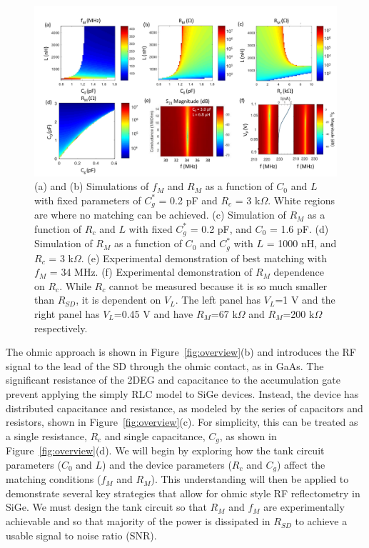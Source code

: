 \documentclass{article}
\begin{document}
	\begin{figure}
		\includegraphics[width = \textwidth]{figures/HarvardFigure2_v7.pdf}		
		\caption{(a) and (b) Simulations of $f_M$ and $R_M$ as a function of $C_0$ and $L$ with fixed parameters of $C^*_g$ = 0.2 pF and $R_c$ = 3 k$\Omega$. White regions are where no matching can be achieved.  (c) Simulation of $R_M$ as a function of $R_c$ and $L$ with fixed $C^*_g$ = 0.2 pF, and $C_0$ = 1.6 pF. (d) Simulation of $R_M$ as a function of $C_0$ and $C^*_g$ with $L$ = 1000 nH, and $R_c$ = 3  k$\Omega$.  (e) Experimental demonstration of best matching with $f_M$ = 34 MHz.  (f) Experimental demonstration of $R_M$ dependence on $R_c$.  While $R_c$ cannot be measured because it is so much smaller than $R_{SD}$, it is dependent on $V_L$.  The left panel has $V_L$=1 V and the right panel has $V_L$=0.45 V and have $R_M$=67 k$\Omega$ and $R_M$=200 k$\Omega$ respectively.
		}
		\label{fig:Harvard}
	\end{figure}



		\label{sub:ohmic_approach_circuit_and_model}
		
		The ohmic approach is shown in Figure\ \ref{fig:overview}(b) and introduces the RF signal to the lead of the SD through the ohmic contact, as in  GaAs.  The significant resistance of the 2DEG and capacitance to the accumulation gate prevent applying the simply RLC model to SiGe devices.  Instead, the device has distributed capacitance and resistance, as modeled by the series of capacitors and resistors, shown in Figure\ \ref{fig:overview}(c).  For simplicity, this can be treated as a single resistance, $R_c$ and single capacitance, $C_g$, as shown in Figure\ \ref{fig:overview}(d).  We will begin by exploring how the tank circuit parameters ($C_0$ and $L$) and the device parameters ($R_c$ and $C_g$) affect the matching conditions ($f_M$ and $R_M$).  This understanding will then be applied to demonstrate several key strategies that allow for ohmic style RF reflectometry in SiGe.  We must design the tank circuit so that $R_M$ and $f_M$ are experimentally achievable and so that majority of the power is dissipated in $R_{SD}$ to achieve a usable signal to noise ratio (SNR).
\end{document}

